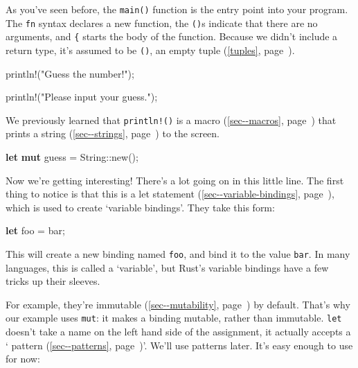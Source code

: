 \documentclass[a4paper,]{book}
\renewcommand*{\hyperref}[2][\ar]{%
  \def\ar{#2}%
  #2 (\autoref{#1}, page~\pageref{#1})}
\newenvironment{Shaded}{\begin{snugshade}}{\end{snugshade}}
\newcommand{\KeywordTok}[1]{\textcolor[rgb]{0.13,0.29,0.53}{\textbf{{#1}}}}
\newcommand{\StringTok}[1]{\textcolor[rgb]{0.31,0.60,0.02}{{#1}}}
\newcommand{\OtherTok}[1]{\textcolor[rgb]{0.56,0.35,0.01}{{#1}}}
\newcommand{\NormalTok}[1]{{#1}}
\begin{document}
As you've seen before, the \texttt{main()} function is the entry point
into your program. The \texttt{fn} syntax declares a new function, the
\texttt{()}s indicate that there are no arguments, and \texttt{\{}
starts the body of the function. Because we didn't include a return
type, it's assumed to be \texttt{()}, an empty \hyperref[tuples]{tuple}.

\begin{Shaded}
\begin{Highlighting}[]
    \OtherTok{println!}\NormalTok{(}\StringTok{"Guess the number!"}\NormalTok{);}

    \OtherTok{println!}\NormalTok{(}\StringTok{"Please input your guess."}\NormalTok{);}
\end{Highlighting}
\end{Shaded}

We previously learned that \texttt{println!()} is a
\hyperref[sec--macros]{macro} that prints a
\hyperref[sec--strings]{string} to the screen.

\begin{Shaded}
\begin{Highlighting}[]
    \KeywordTok{let} \KeywordTok{mut} \NormalTok{guess = String::new();}
\end{Highlighting}
\end{Shaded}

Now we're getting interesting! There's a lot going on in this little
line. The first thing to notice is that this is a
\hyperref[sec--variable-bindings]{let statement}, which is used to
create `variable bindings'. They take this form:

\begin{Shaded}
\begin{Highlighting}[]
\KeywordTok{let} \NormalTok{foo = bar;}
\end{Highlighting}
\end{Shaded}

This will create a new binding named \texttt{foo}, and bind it to the
value \texttt{bar}. In many languages, this is called a `variable', but
Rust's variable bindings have a few tricks up their sleeves.

For example, they're \hyperref[sec--mutability]{immutable} by default.
That's why our example uses \texttt{mut}: it makes a binding mutable,
rather than immutable. \texttt{let} doesn't take a name on the left hand
side of the assignment, it actually accepts a
`\hyperref[sec--patterns]{pattern}'. We'll use patterns later. It's easy
enough to use for now:
\end{document}
